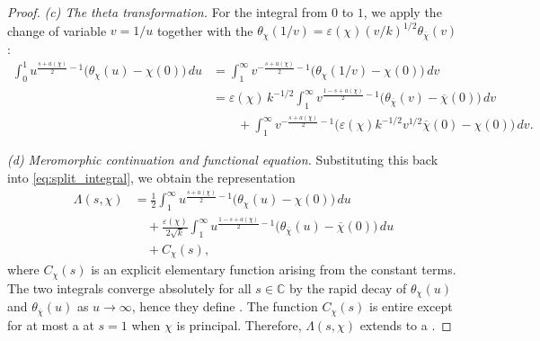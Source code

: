 \begin{proof}
\medskip
\noindent \emph{(c) The theta transformation.} For the integral from $0$ to $1$, we apply the change of variable $v = 1/u$ together with the  $\theta_\chi(1/v) = \varepsilon(\chi)(v/k)^{1/2}\theta_{\overline{\chi}}(v)$:
\begin{align*}
\int_0^1 u^{\frac{s + a(\chi)}{2} - 1} \bigl( \theta_\chi(u) - \chi(0) \bigr) \, du
&= \int_1^\infty v^{-\frac{s + a(\chi)}{2} - 1} \bigl( \theta_\chi(1/v) - \chi(0) \bigr) \, dv \\
&= \varepsilon(\chi) \, k^{-1/2} \int_1^\infty v^{\frac{1 - s + a(\chi)}{2} - 1} \bigl( \theta_{\overline{\chi}}(v) - \overline{\chi}(0) \bigr) \, dv \\
&\qquad + \int_1^\infty v^{-\frac{s + a(\chi)}{2} - 1} \bigl( \varepsilon(\chi) k^{-1/2} v^{1/2} \overline{\chi}(0) - \chi(0) \bigr) \, dv.
\end{align*}

\medskip
\noindent \emph{(d) Meromorphic continuation and functional equation.} Substituting this back into \eqref{eq:split_integral}, we obtain the representation
\begin{align*}
\Lambda(s, \chi) &= \frac{1}{2} \int_1^\infty u^{\frac{s + a(\chi)}{2} - 1} \bigl( \theta_\chi(u) - \chi(0) \bigr) \, du \\
&\quad + \frac{\varepsilon(\chi)}{2\sqrt{k}} \int_1^\infty u^{\frac{1 - s + a(\chi)}{2} - 1} \bigl( \theta_{\overline{\chi}}(u) - \overline{\chi}(0) \bigr) \, du \\
&\quad + C_\chi(s),
\end{align*}
where $C_\chi(s)$ is an explicit elementary function arising from the constant terms. The two integrals converge absolutely for all $s \in \mathbb{C}$ by the rapid decay of $\theta_\chi(u)$ and $\theta_{\overline{\chi}}(u)$ as $u \to \infty$, hence they define . The function $C_\chi(s)$ is entire except for at most a  at $s = 1$ when $\chi$ is principal. Therefore, $\Lambda(s, \chi)$ extends to a .


\end{proof}
